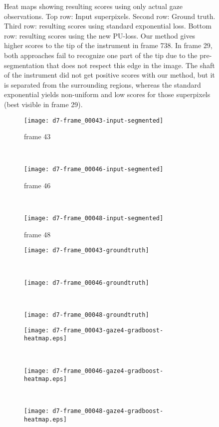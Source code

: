 \begin{figure}[ht]
	\caption{Heat maps showing resulting scores using only actual gaze observations. Top row: Input superpixels. Second row: Ground truth. Third row: resulting scores using standard exponential loss. Bottom row: resulting scores using the new PU-loss. Our method gives higher scores to the tip of the instrument in frame 738. In frame 29, both approaches fail to recognize one part of the tip due to the pre-segmentation that does not respect this edge in the image. The shaft of the instrument did not get positive scores with our method, but it is separated from the surrounding regions, whereas the standard exponential yields non-uniform and low scores for those superpixels (best visible in frame 29).}
	\label{fig:results-d2-gaze2}
\end{figure}

\begin{figure}[ht]
	\centering
	\begin{subfigure}[h]{0.32\textwidth}
	\texttt{[image: d7-frame\_00043-input-segmented]}	
		\caption*{frame 43}
	\end{subfigure}
	~
	\begin{subfigure}[h]{0.32\textwidth}
	\texttt{[image: d7-frame\_00046-input-segmented]}	
		\caption*{frame 46}
	\end{subfigure}
	~
	\begin{subfigure}[h]{0.32\textwidth}
	\texttt{[image: d7-frame\_00048-input-segmented]}	
		\caption*{frame 48}
	\end{subfigure}
	
	\vspace{3mm}
	\begin{subfigure}[h]{0.32\textwidth}
	\texttt{[image: d7-frame\_00043-groundtruth]}	
	\end{subfigure}
	~
	\begin{subfigure}[h]{0.32\textwidth}
	\texttt{[image: d7-frame\_00046-groundtruth]}	
	\end{subfigure}
	~
	\begin{subfigure}[h]{0.32\textwidth}
	\texttt{[image: d7-frame\_00048-groundtruth]}	
	\end{subfigure}
	
	\vspace{3mm}
	\begin{subfigure}[h]{0.32\textwidth}
	\texttt{[image: d7-frame\_00043-gaze4-gradboost-heatmap.eps]}	
	\end{subfigure}
	~
	\begin{subfigure}[h]{0.32\textwidth}
	\texttt{[image: d7-frame\_00046-gaze4-gradboost-heatmap.eps]}
	\end{subfigure}
	~	
	\begin{subfigure}[h]{0.32\textwidth}
	\texttt{[image: d7-frame\_00048-gaze4-gradboost-heatmap.eps]}	
	\end{subfigure}
	

\end{figure}
